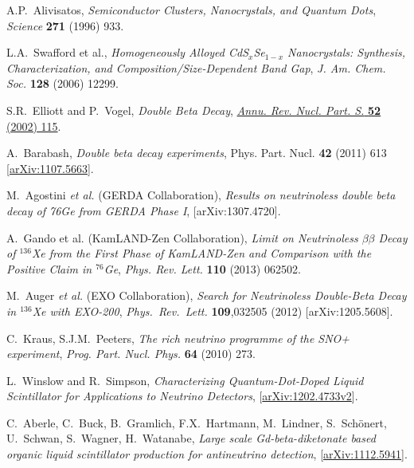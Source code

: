 \documentclass[cits]{JINST}
\begin{document}
\newpage
\begin{thebibliography}{9}

A.P.~Alivisatos, \emph{Semiconductor Clusters, Nanocrystals, and Quantum Dots}, \emph{Science} {\bf 271} (1996) 933.

L.A.~Swafford et al., \emph{Homogeneously Alloyed CdS$_{x}$Se$_{1-x}$ Nanocrystals: Synthesis, Characterization, and Composition/Size-Dependent Band Gap}, \emph{J. Am. Chem. Soc.} {\bf 128} (2006) 12299.

S.R.~Elliott and P.~Vogel, \emph{Double Beta Decay}, \href{http://www.annualreviews.org/doi/abs/10.1146/annurev.nucl.52.050102.090641}{\emph{Annu. Rev. Nucl. Part. S.} {\bf 52} (2002) 115}.

A.~Barabash, \emph{Double beta decay experiments}, Phys. Part. Nucl. {\bf 42} (2011) 613 [\href{http://arxiv.org/abs/1107.5663}{arXiv:1107.5663}].

  M.~Agostini {\it et al.} (GERDA Collaboration), \emph{Results on neutrinoless double beta decay of 76Ge from GERDA Phase I}, [arXiv:1307.4720].

A.~Gando et al. (KamLAND-Zen Collaboration), \emph{Limit on Neutrinoless $\beta\beta$ Decay of $^{136}$Xe from the First Phase of KamLAND-Zen and Comparison with the Positive Claim in $^{76}$Ge}, \emph{Phys. Rev. Lett.} {\bf 110} (2013) 062502. 

  M.~Auger {\it et al.} (EXO Collaboration), \emph{Search for Neutrinoless Double-Beta Decay in $^{136}$Xe with EXO-200}, \emph{Phys.\ Rev.\ Lett.} {\bf 109},032505 (2012) [arXiv:1205.5608].
  
C.~Kraus, S.J.M.~Peeters, \emph{The rich neutrino programme of the SNO+ experiment}, \emph{Prog. Part. Nucl. Phys.} {\bf 64} (2010) 273.

L.~Winslow and R.~Simpson, \emph{Characterizing Quantum-Dot-Doped Liquid Scintillator for Applications to Neutrino Detectors},  [\href{http://arxiv.org/abs/1202.4733}{arXiv:1202.4733v2}].

C.~Aberle, C.~Buck, B.~Gramlich, F.X.~Hartmann, M.~Lindner, S.~Sch\"{o}nert, U.~Schwan, S.~Wagner, H.~Watanabe, \emph{Large scale Gd-beta-diketonate based organic liquid scintillator production for antineutrino detection},  [\href{http://arxiv.org/abs/1112.5941v2}{arXiv:1112.5941}].


\end{thebibliography}
\end{document}
